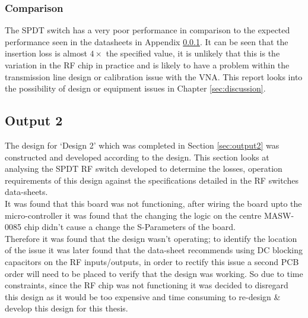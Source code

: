 \documentclass[12pt,openany,a4paper]{book}
\begin{document}
\subsubsection{Comparison}
The SPDT switch has a very poor performance in comparison to the expected performance seen in the datasheets in Appendix \ref{}. It can be seen that the insertion loss is almost $4\times$ the specified value, it is unlikely that this is the variation in the RF chip in practice and is likely to have a problem within the transmission line design or calibration issue with the VNA. This report looks into the possibility of design or equipment issues in Chapter \ref{sec:discussion}.





\subsection{Output 2}		\label{sec:res_out2}
The design for `Design 2' which was completed in Section \ref{sec:output2} was constructed and developed according to the design. This section looks at analysing the SPDT RF switch developed to determine the losses, operation requirements of this design against the specifications detailed in the RF switches data-sheets. \\[0.2cm]
It was found that this board was not functioning, after wiring the board upto the micro-controller it was found that the changing the logic on the centre MASW-0085 chip didn't cause a change the S-Parameters of the board.
\\[0.2cm]
Therefore it was found that the design wasn't operating; to identify the location of the issue it was later found that the data-sheet recommends using DC blocking capacitors on the RF inputs/outputs, in order to rectify this issue a second PCB order will need to be placed to verify that the design was working. So due to time constraints, since the RF chip was not functioning it was decided to disregard this design as it would be too expensive and time consuming to re-design \& develop this design for this thesis.
\end{document}
